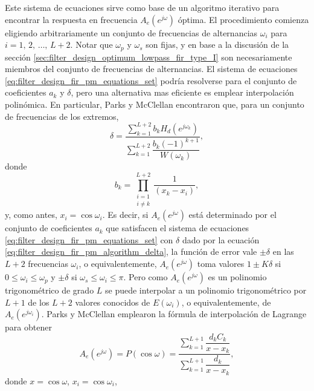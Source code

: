 \documentclass[a4paper]{report}
\begin{document}
Este sistema de ecuaciones sirve como base de un algoritmo iterativo para encontrar la respuesta en frecuencia \(A_e(e^{j\omega})\) óptima. El procedimiento comienza eligiendo arbitrariamente un conjunto de frecuencias de alternancias \(\omega_i\) para \(i=1,\,2,\,\dots,\,L+2\). Notar que \(\omega_p\) y \(\omega_s\) son fijas, y en base a la discusión de la sección \ref{sec:filter_design_optimum_lowpass_fir_type_I} son necesariamente miembros del conjunto de frecuencias de alternancias. El sistema de ecuaciones \ref{eq:filter_design_fir_pm_equations_set} podría resolverse para el conjunto de coeficientes \(a_k\) y \(\delta\), pero una alternativa mas eficiente es emplear interpolación polinómica. En particular, Parks y McClellan \cite{parks1972chebyshev}\cite{parks1972program} encontraron que, para un conjunto de frecuencias de los extremos,
\begin{equation}\label{eq:filter_design_fir_pm_algorithm_delta}
 \delta=\dfrac{\displaystyle\sum_{k=1}^{L+2}b_kH_d(e^{j\omega_k})}{\displaystyle\sum_{k=1}^{L+2}\dfrac{b_k(-1)^{k+1}}{W(\omega_k)}},
\end{equation}
donde
\begin{equation}\label{eq:filter_design_fir_pm_algorithm_bk}
 b_k=\prod_{\substack{i=1\\i\neq k}}^{L+2}\frac{1}{(x_k-x_i)},
\end{equation}
y, como antes, \(x_i=\cos\omega_i\). Es decir, si \(A_e(e^{j\omega})\) está determinado por el conjunto de coeficientes \(a_k\) que satisfacen el sistema de ecuaciones \ref{eq:filter_design_fir_pm_equations_set} con \(\delta\) dado por la ecuación \ref{eq:filter_design_fir_pm_algorithm_delta}, la función de error vale \(\pm\delta\) en las \(L+2\) frecuencias \(\omega_i\), o equivalentemente, \(A_e(e^{j\omega})\) toma valores \(1\pm K\delta\) si \(0\leq\omega_i\leq\omega_p\) y \(\pm\delta\) si \(\omega_s\leq\omega_i\leq\pi\). Pero como \(A_e(e^{j\omega})\) es un polinomio trigonométrico de grado \(L\) se puede interpolar a un polinomio trigonométrico por \(L+1\) de los \(L+2\) valores conocidos de \(E(\omega_i)\), o equivalentemente, de \(A_e(e^{j\omega_i})\). Parks y McClellan emplearon la fórmula de interpolación de Lagrange para obtener
\begin{equation}\label{eq:filter_design_fir_pm_algorithm_Ae}
 A_e(e^{j\omega})=P(\cos\omega)=\dfrac{\displaystyle\sum_{k=1}^{L+1}\dfrac{d_kC_k}{x-x_k}}{\displaystyle\sum_{k=1}^{L+1}\dfrac{d_k}{x-x_k}},
\end{equation}
donde \(x=\cos\omega\), \(x_i=\cos\omega_i\),
\end{document}
